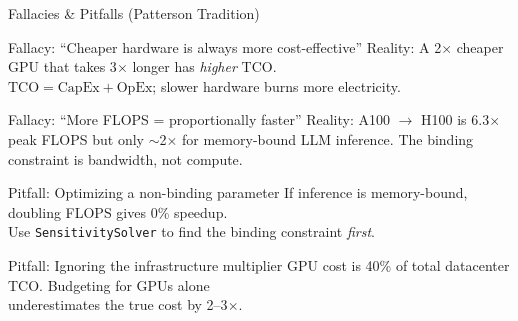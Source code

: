 \documentclass[aspectratio=169, 12pt]{beamer}
\begin{document}
\begin{frame}{Fallacies \& Pitfalls (Patterson Tradition)}
\begin{block}{Fallacy: ``Cheaper hardware is always more cost-effective''}
Reality: A 2$\times$ cheaper GPU that takes 3$\times$ longer has \emph{higher} TCO.\\
$\text{TCO} = \text{CapEx} + \text{OpEx}$; slower hardware burns more electricity.
\end{block}

\begin{block}{Fallacy: ``More FLOPS = proportionally faster''}
Reality: A100 $\to$ H100 is 6.3$\times$ peak FLOPS but only $\sim$2$\times$ for
memory-bound LLM inference. The binding constraint is bandwidth, not compute.
\end{block}

\begin{block}{Pitfall: Optimizing a non-binding parameter}
If inference is memory-bound, doubling FLOPS gives 0\% speedup.\\
Use \texttt{SensitivitySolver} to find the binding constraint \emph{first}.
\end{block}

\begin{block}{Pitfall: Ignoring the infrastructure multiplier}
GPU cost is 40\% of total datacenter TCO. Budgeting for GPUs alone\\
underestimates the true cost by 2--3$\times$.
\end{block}
\end{frame}
\end{document}
